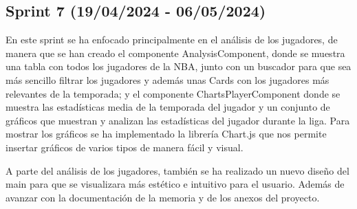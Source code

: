 \hfill


\subsection{Sprint 7 (19/04/2024 - 06/05/2024)}
En este sprint se ha enfocado principalmente en el análisis de los jugadores, de manera que se han creado el componente AnalysisComponent, donde se muestra una tabla con todos los jugadores de la NBA, junto con un buscador para que sea más sencillo filtrar los jugadores y además unas Cards con los jugadores más relevantes de la temporada; y el componente ChartsPlayerComponent donde se muestra las estadísticas media de la temporada del jugador y un conjunto de gráficos que muestran y analizan las estadísticas del jugador durante la liga. Para mostrar los gráficos se ha implementado la librería Chart.js que nos permite insertar gráficos de varios tipos de manera fácil y visual.

A parte del análisis de los jugadores, también se ha realizado un nuevo diseño del main para que se visualizara más estético e intuitivo para el usuario. Además de avanzar con la documentación de la memoria y de los anexos del proyecto.

\hfill


\hfill

